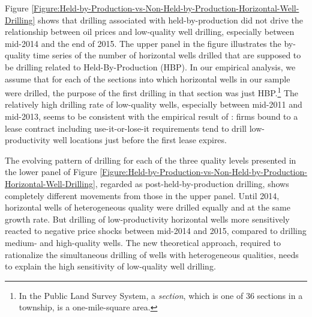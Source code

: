 Figure \ref{Figure:Held-by-Production-vs-Non-Held-by-Production-Horizontal-Well-Drilling} shows that drilling associated with held-by-production did not drive the relationship between oil prices and low-quality well drilling, especially between mid-2014 and the end of 2015. The upper panel in the figure illustrates the by-quality time series of the number of horizontal wells drilled that are supposed to be drilling related to Held-By-Production (HBP). In our empirical analysis, we assume that for each of the sections into which horizontal wells in our sample were drilled, the purpose of the first drilling in that section was just HBP.\footnote{In the Public Land Survey System, a \textit{section}, which is one of 36 sections in a township, is a one-mile-square area.} The relatively high drilling rate of low-quality wells, especially between mid-2011 and mid-2013, seems to be consistent with the empirical result of \cite{The-Economics-of-Time-Limited-Development-Options_2020_Herrnstadt-Kellogg-and-Lewis}: firms bound to a lease contract including use-it-or-lose-it requirements tend to drill low-productivity well locations just before the first lease expires.

The evolving pattern of drilling for each of the three quality levels presented in the lower panel of Figure \ref{Figure:Held-by-Production-vs-Non-Held-by-Production-Horizontal-Well-Drilling}, regarded as post-held-by-production drilling, shows completely different movements from those in the upper panel. Until 2014, horizontal wells of heterogeneous quality were drilled equally and at the same growth rate. But drilling of low-productivity horizontal wells more sensitively reacted to negative price shocks between mid-2014 and 2015, compared to drilling medium- and high-quality wells. The new theoretical approach, required to rationalize the simultaneous drilling of wells with heterogeneous qualities, needs to explain the high sensitivity of low-quality well drilling.